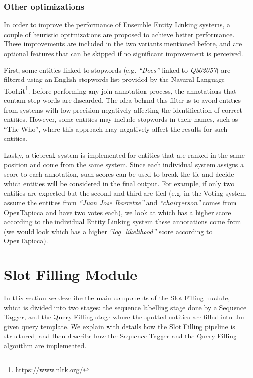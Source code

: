 \subsubsection{Other optimizations}
\label{cap3:system/entLinModule/ensembleSystems/optimizations}
In order to improve the performance of Ensemble Entity Linking systems, a couple of heuristic 
optimizations are proposed to achieve better performance. These improvements are included in 
the two variants mentioned before, and are optional features that can be skipped if no 
significant improvement is perceived. 

First, some entities linked to stopwords (e.g. \textit{“Does”} linked to \textit{Q302057}) are 
filtered using an English stopwords list provided by the Natural Language Toolkit\footnote{\url{https://www.nltk.org/}}. 
Before performing any join annotation process, the annotations that contain stop words are 
discarded. The idea behind this filter is to avoid entities from systems with low precision 
negatively affecting the identification of correct entities. However, some entities may 
include stopwords in their names, such as “The Who”, where this approach may negatively 
affect the results for such entities.

Lastly, a tiebreak system is implemented for entities that are ranked in the same position 
and come from the same system. Since each individual system assigns a score to each annotation, 
such scores can be used to break the tie and decide which entities will be considered in the 
final output. For example, if only two entities are expected but the second and third are 
tied (e.g. in the Voting system assume the entities from \textit{“Juan Jose Ibarretxe”} and 
\textit{“chairperson”} comes from OpenTapioca and have two votes each), we look at which has 
a higher score according to the individual Entity Linking system these annotations come from 
(we would look which has a higher \textit{“log\_likelihood”} score according to OpenTapioca). 

\section{Slot Filling Module}
\label{cap3:system/slotFillModule}
In this section we describe the main components of the Slot Filling module, which is divided 
into two stages: the sequence labelling stage done by a Sequence Tagger, and the Query 
Filling stage where the spotted entities are filled into the given query template. We explain 
with details how the Slot Filling pipeline is structured, and then describe how the Sequence 
Tagger and the Query Filling algorithm are implemented.

